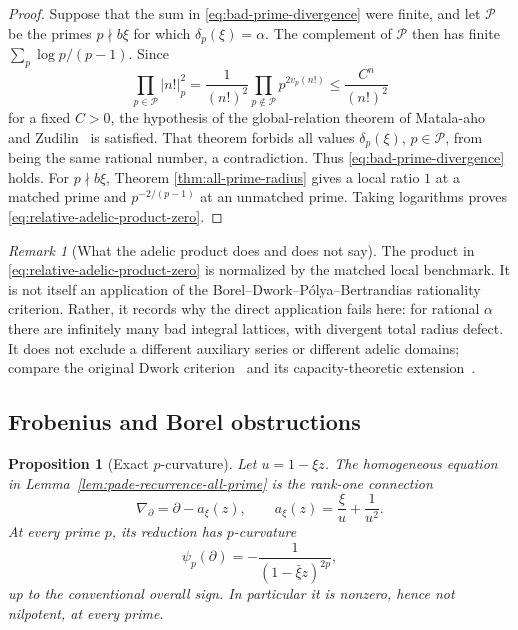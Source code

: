\documentclass[11pt]{article}
\newtheorem{proposition}[theorem]{Proposition}
\theoremstyle{definition}
\theoremstyle{remark}
\newtheorem{remark}[theorem]{Remark}
\begin{document}
\begin{proof}
Suppose that the sum in \eqref{eq:bad-prime-divergence} were finite, and let
$\mathcal P$ be the primes $p\nmid b\xi$ for which
$\delta_p(\xi)=\alpha$.  The complement of $\mathcal P$ then has finite
$\sum_p\log p/(p-1)$.  Since
\[
 \prod_{p\in\mathcal P}|n!|_p^2
 =\frac1{(n!)^2}\prod_{p\notin\mathcal P}p^{2v_p(n!)}
 \leq\frac{C^n}{(n!)^2}
\]
for a fixed $C>0$, the hypothesis of the global-relation theorem of
Matala-aho and Zudilin~\cite{MZ2018} is satisfied.  That
theorem forbids all values $\delta_p(\xi)$, $p\in\mathcal P$, from being the
same rational number, a contradiction.  Thus
\eqref{eq:bad-prime-divergence} holds.  For $p\nmid b\xi$, Theorem
\ref{thm:all-prime-radius} gives a local ratio $1$ at a matched prime and
$p^{-2/(p-1)}$ at an unmatched prime.  Taking logarithms proves
\eqref{eq:relative-adelic-product-zero}.
\end{proof}

\begin{remark}[What the adelic product does and does not say]
The product in \eqref{eq:relative-adelic-product-zero} is normalized by the
matched local benchmark.  It is not itself an application of the
Borel--Dwork--P\'olya--Bertrandias rationality criterion.  Rather, it records
why the direct application fails here: for rational $\alpha$ there are
infinitely many bad integral lattices, with divergent total radius defect.
It does not exclude a different auxiliary series or different adelic
domains; compare the original Dwork criterion~\cite{Dwork1960} and its
capacity-theoretic extension~\cite{BostChambertLoir2009}.
\end{remark}

\subsection{Frobenius and Borel obstructions}

\begin{proposition}[Exact $p$-curvature]
\label{prop:exact-p-curvature}
Let $u=1-\xi z$.  The homogeneous equation in
Lemma~\ref{lem:pade-recurrence-all-prime} is the rank-one connection
\[
 \nabla_\partial=\partial-a_\xi(z),
 \qquad
 a_\xi(z)=\frac{\xi}{u}+\frac1{u^2}.
\]
At every prime $p$, its reduction has $p$-curvature
\begin{equation}
 \psi_p(\partial)=-\frac1{(1-\bar\xi z)^{2p}},
\label{eq:exact-p-curvature}
\end{equation}
up to the conventional overall sign.  In particular it is nonzero, hence
not nilpotent, at every prime.
\end{proposition}
\end{document}
